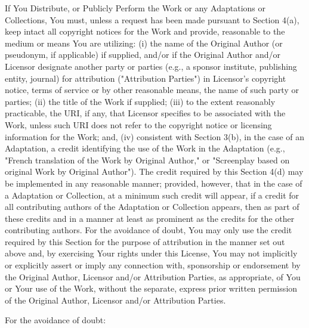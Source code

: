 \item
    If You Distribute, or Publicly Perform the Work or any Adaptations or
    Collections, You must, unless a request has been made pursuant to
    Section 4(a), keep intact all copyright notices for the Work and
    provide, reasonable to the medium or means You are utilizing: (i) the
    name of the Original Author (or pseudonym, if applicable) if supplied,
    and/or if the Original Author and/or Licensor designate another party
    or parties (e.g., a sponsor institute, publishing entity, journal) for
    attribution ("Attribution Parties") in Licensor's copyright notice,
    terms of service or by other reasonable means, the name of such party
    or parties; (ii) the title of the Work if supplied; (iii) to the
    extent reasonably practicable, the URI, if any, that Licensor
    specifies to be associated with the Work, unless such URI does not
    refer to the copyright notice or licensing information for the Work;
    and, (iv) consistent with Section 3(b), in the case of an Adaptation,
    a credit identifying the use of the Work in the Adaptation (e.g.,
    "French translation of the Work by Original Author," or "Screenplay
    based on original Work by Original Author"). The credit required by
    this Section 4(d) may be implemented in any reasonable manner;
    provided, however, that in the case of a Adaptation or Collection, at
    a minimum such credit will appear, if a credit for all contributing
    authors of the Adaptation or Collection appears, then as part of these
    credits and in a manner at least as prominent as the credits for the
    other contributing authors. For the avoidance of doubt, You may only
    use the credit required by this Section for the purpose of attribution
    in the manner set out above and, by exercising Your rights under this
    License, You may not implicitly or explicitly assert or imply any
    connection with, sponsorship or endorsement by the Original Author,
    Licensor and/or Attribution Parties, as appropriate, of You or Your
    use of the Work, without the separate, express prior written
    permission of the Original Author, Licensor and/or Attribution
    Parties.

\item
    For the avoidance of doubt:

